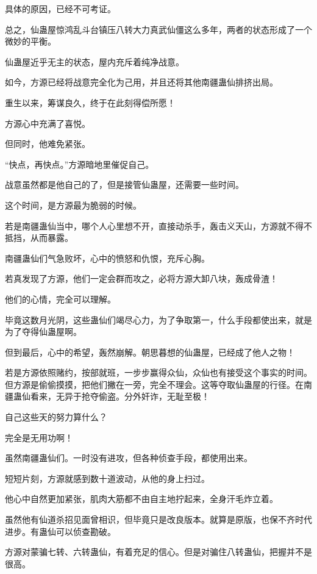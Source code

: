 
\begin{this_body}



具体的原因，已经不可考证。

总之，仙蛊屋惊鸿乱斗台镇压八转大力真武仙僵这么多年，两者的状态形成了一个微妙的平衡。

仙蛊屋近乎无主的状态，屋内充斥着纯净战意。

如今，方源已经将战意完全化为己用，并且还将其他南疆蛊仙排挤出局。

重生以来，筹谋良久，终于在此刻得偿所愿！

方源心中充满了喜悦。

但同时，他难免紧张。

“快点，再快点。”方源暗地里催促自己。

战意虽然都是他自己的了，但是接管仙蛊屋，还需要一些时间。

这个时间，是方源最为脆弱的时候。

若是南疆蛊仙当中，哪个人心里想不开，直接动杀手，轰击义天山，方源就不得不抵挡，从而暴露。

南疆蛊仙们气急败坏，心中的愤怒和仇恨，充斥心胸。

若真发现了方源，他们一定会群而攻之，必将方源大卸八块，轰成骨渣！

他们的心情，完全可以理解。

毕竟这数月光阴，这些蛊仙们竭尽心力，为了争取第一，什么手段都使出来，就是为了夺得仙蛊屋啊。

但到最后，心中的希望，轰然崩解。朝思暮想的仙蛊屋，已经成了他人之物！

若是方源依照赌约，按部就班，一步步赢得众仙，众仙也有接受这个事实的时间。但方源是偷偷摸摸，把他们撇在一旁，完全不理会。这等夺取仙蛊屋的行径。在南疆蛊仙看来，无异于抢夺偷盗。分外奸诈，无耻至极！

自己这些天的努力算什么？

完全是无用功啊！

虽然南疆蛊仙们。一时没有进攻，但各种侦查手段，都使用出来。

短短片刻，方源就感到数十道波动，从他的身上扫过。

他心中自然更加紧张，肌肉大筋都不由自主地拧起来，全身汗毛炸立着。

虽然他有仙道杀招见面曾相识，但毕竟只是改良版本。就算是原版，也保不齐时代进步。有蛊仙可以侦查勘破。

方源对蒙骗七转、六转蛊仙，有着充足的信心。但是对骗住八转蛊仙，把握并不是很高。


\end{this_body}
